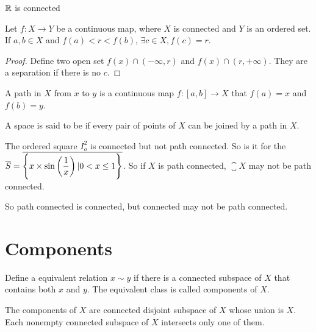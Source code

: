 \begin{theorem}
    $\mathbb{R}$ is connected
\end{theorem}

\begin{theorem}
    Let $f : X \rightarrow Y$ be a continuous map, where $X$ is connected and $Y$ is an ordered set. If $a,b \in X$ and $f(a) < r < f(b)$, $\exists c \in X, f(c) = r$.
\end{theorem}
\begin{proof}
    Define two open set $f(x) \cap (-\infty, r)$ and $f(x) \cap (r, +\infty)$. They are a separation if there is no $c$.
\end{proof}

\begin{definition}
    A path in $X$ from $x$ to $y$ is a continuous map $f: [a,b] \rightarrow X$ that $f(a) = x$ and $f(b) = y$.
    
    A space is said to be  if every pair of points of $X$ can be joined by a path in $X$.
\end{definition}

\begin{example}
    The ordered square $I_o^2$ is connected but not path connected. So is it for the  $\overline{S} = \overline{\set{\displaystyle x \times \sin \left(\frac{1}{x} \right) | 0 < x \leq 1}}$. So if $X$ is path connected, $\closure{X}$ may not be path connected.
    
    So path connected is connected, but connected may not be path connected.
\end{example}


\section{Components}

\begin{definition}
    Define a equivalent relation $x \sim y$ if there is a connected subspace of $X$ that contains both $x$ and $y$. The equivalent class is called components of $X$.
\end{definition}

\begin{theorem}
The components of $X$ are connected disjoint subspace of $X$ whose union is $X$. Each nonempty connected subspace of $X$ intersects only one of them.    
\end{theorem}

